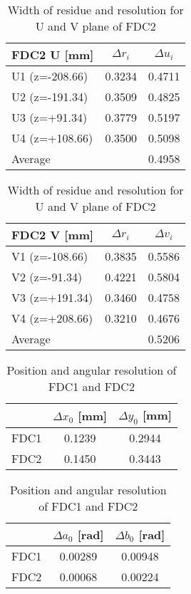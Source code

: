 \begin{table}[h]
    \centering
    \begin{tabular}{l|cc}
    \hline
       FDC2 U [mm] & $\Delta r_i$ & $\Delta u_i$  \\
    \hline
        U1 (z=-208.66) & 0.3234 & 0.4711     \\
        U2 (z=-191.34) & 0.3509 & 0.4825     \\
        U3 (z=+91.34)  & 0.3779 & 0.5197     \\
        U4 (z=+108.66) & 0.3500 & 0.5098     \\
    \hline
    Average &        &  0.4958 \\
    \hline
    \end{tabular}
    \begin{tabular}{l|cc}
    \hline
     FDC2 V [mm]  & $\Delta r_i$ & $\Delta v_i$ \\
    \hline
         V1 (z=-108.66) & 0.3835 & 0.5586 \\
         V2 (z=-91.34)  & 0.4221 & 0.5804 \\
         V3 (z=+191.34) & 0.3460 & 0.4758 \\
         V4 (z=+208.66) & 0.3210 & 0.4676 \\
    \hline
    Average &        & 0.5206 \\
    \hline
    \end{tabular}
    \caption{Width of residue and resolution for U and V plane of FDC2}
\end{table}

\begin{table}[h]
    \centering
    \begin{tabular}{c|cc}
        \hline
                &  $\Delta x_0$ [mm] & $\Delta y_0$ [mm]\\
            \hline
            FDC1 & 0.1239 & 0.2944 \\
            FDC2 &  0.1450 & 0.3443\\
            \hline
    \end{tabular}
    \begin{tabular}{c|cc}
    \hline
        & $\Delta a_0$ [rad] & $\Delta b_0$ [rad]\\
        \hline
        FDC1 & 0.00289 & 0.00948\\
        FDC2 & 0.00068 & 0.00224 \\
        \hline
    \end{tabular}
    \caption{Position and angular resolution of FDC1 and FDC2}
\end{table}